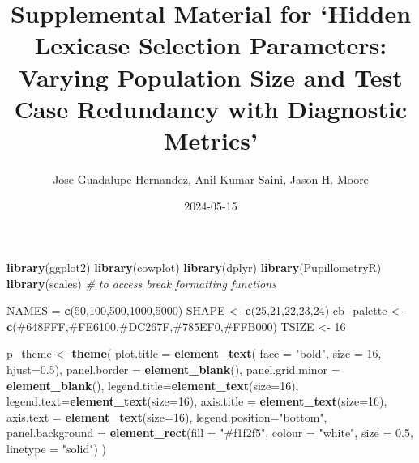 \documentclass[
]{book}
\title{Supplemental Material for `Hidden Lexicase Selection Parameters: Varying Population Size and Test Case Redundancy with Diagnostic Metrics'}
\author{Jose Guadalupe Hernandez, Anil Kumar Saini, Jason H. Moore}
\date{2024-05-15}
\newenvironment{Shaded}{\begin{snugshade}}{\end{snugshade}}
\newcommand{\AttributeTok}[1]{\textcolor[rgb]{0.13,0.29,0.53}{#1}}
\newcommand{\CommentTok}[1]{\textcolor[rgb]{0.56,0.35,0.01}{\textit{#1}}}
\newcommand{\DecValTok}[1]{\textcolor[rgb]{0.00,0.00,0.81}{#1}}
\newcommand{\FloatTok}[1]{\textcolor[rgb]{0.00,0.00,0.81}{#1}}
\newcommand{\FunctionTok}[1]{\textcolor[rgb]{0.13,0.29,0.53}{\textbf{#1}}}
\newcommand{\NormalTok}[1]{#1}
\newcommand{\OtherTok}[1]{\textcolor[rgb]{0.56,0.35,0.01}{#1}}
\newcommand{\StringTok}[1]{\textcolor[rgb]{0.31,0.60,0.02}{#1}}
\begin{document}
\maketitle

{
\setcounter{tocdepth}{1}
\tableofcontents
}
\begin{Shaded}
\begin{Highlighting}[]
\FunctionTok{library}\NormalTok{(ggplot2)}
\FunctionTok{library}\NormalTok{(cowplot)}
\FunctionTok{library}\NormalTok{(dplyr)}
\FunctionTok{library}\NormalTok{(PupillometryR)}
\FunctionTok{library}\NormalTok{(scales) }\CommentTok{\# to access break formatting functions}


\NormalTok{NAMES }\OtherTok{=} \FunctionTok{c}\NormalTok{(}\DecValTok{50}\NormalTok{,}\DecValTok{100}\NormalTok{,}\DecValTok{500}\NormalTok{,}\DecValTok{1000}\NormalTok{,}\DecValTok{5000}\NormalTok{)}
\NormalTok{SHAPE }\OtherTok{\textless{}{-}} \FunctionTok{c}\NormalTok{(}\DecValTok{25}\NormalTok{,}\DecValTok{21}\NormalTok{,}\DecValTok{22}\NormalTok{,}\DecValTok{23}\NormalTok{,}\DecValTok{24}\NormalTok{)}
\NormalTok{cb\_palette }\OtherTok{\textless{}{-}} \FunctionTok{c}\NormalTok{(}\StringTok{\textquotesingle{}\#648FFF\textquotesingle{}}\NormalTok{,}\StringTok{\textquotesingle{}\#FE6100\textquotesingle{}}\NormalTok{,}\StringTok{\textquotesingle{}\#DC267F\textquotesingle{}}\NormalTok{,}\StringTok{\textquotesingle{}\#785EF0\textquotesingle{}}\NormalTok{,}\StringTok{\textquotesingle{}\#FFB000\textquotesingle{}}\NormalTok{)}
\NormalTok{TSIZE }\OtherTok{\textless{}{-}} \DecValTok{16}

\NormalTok{p\_theme }\OtherTok{\textless{}{-}} \FunctionTok{theme}\NormalTok{(}
  \AttributeTok{plot.title =} \FunctionTok{element\_text}\NormalTok{( }\AttributeTok{face =} \StringTok{"bold"}\NormalTok{, }\AttributeTok{size =} \DecValTok{16}\NormalTok{, }\AttributeTok{hjust=}\FloatTok{0.5}\NormalTok{),}
  \AttributeTok{panel.border =} \FunctionTok{element\_blank}\NormalTok{(),}
  \AttributeTok{panel.grid.minor =} \FunctionTok{element\_blank}\NormalTok{(),}
  \AttributeTok{legend.title=}\FunctionTok{element\_text}\NormalTok{(}\AttributeTok{size=}\DecValTok{16}\NormalTok{),}
  \AttributeTok{legend.text=}\FunctionTok{element\_text}\NormalTok{(}\AttributeTok{size=}\DecValTok{16}\NormalTok{),}
  \AttributeTok{axis.title =} \FunctionTok{element\_text}\NormalTok{(}\AttributeTok{size=}\DecValTok{16}\NormalTok{),}
  \AttributeTok{axis.text =} \FunctionTok{element\_text}\NormalTok{(}\AttributeTok{size=}\DecValTok{16}\NormalTok{),}
  \AttributeTok{legend.position=}\StringTok{"bottom"}\NormalTok{,}
  \AttributeTok{panel.background =} \FunctionTok{element\_rect}\NormalTok{(}\AttributeTok{fill =} \StringTok{"\#f1f2f5"}\NormalTok{,}
                                  \AttributeTok{colour =} \StringTok{"white"}\NormalTok{,}
                                  \AttributeTok{size =} \FloatTok{0.5}\NormalTok{, }\AttributeTok{linetype =} \StringTok{"solid"}\NormalTok{)}
\NormalTok{)}
\end{Highlighting}
\end{Shaded}
\end{document}
